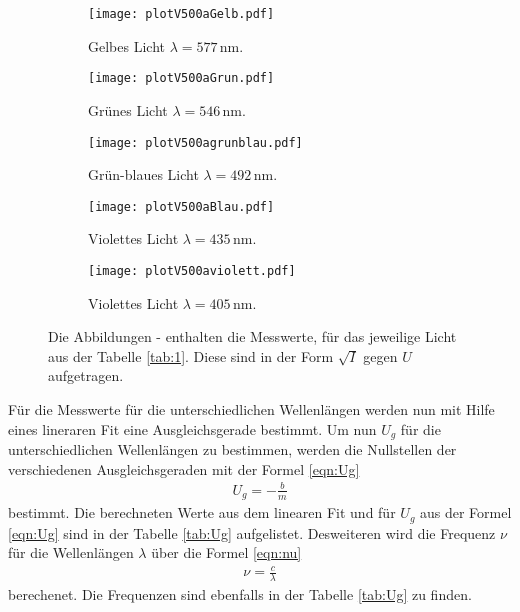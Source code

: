 \begin{figure}
\centering
\begin{subfigure}{0.48\textwidth}
\centering
\texttt{[image: plotV500aGelb.pdf]}
\caption{Gelbes Licht $\lambda=577\,\si{\nano\meter}$.}
\label{fig:ge}
\end{subfigure}
\begin{subfigure}{0.48\textwidth}
\centering
\texttt{[image: plotV500aGrun.pdf]}
\caption{Grünes Licht $\lambda=546\,\si{\nano\meter}$.}
\label{fig:gr}
\end{subfigure}

\begin{subfigure}{0.48\textwidth}
\centering
\texttt{[image: plotV500agrunblau.pdf]}
\caption{Grün-blaues Licht  $\lambda=492\,\si{\nano\meter}$.}
\label{fig:gb}
\end{subfigure}
\begin{subfigure}{0.48\textwidth}
\centering
\texttt{[image: plotV500aBlau.pdf]}
\caption{Violettes Licht $\lambda=435\,\si{\nano\meter}$.}
\label{fig:v1}
\end{subfigure}

\begin{subfigure}{0.48\textwidth}
\centering
\texttt{[image: plotV500aviolett.pdf]}
\caption{Violettes Licht $\lambda=405\,\si{\nano\meter}$.}
\label{fig:v2}
\end{subfigure}

\caption{Die Abbildungen - enthalten die
Messwerte, für das jeweilige Licht aus der Tabelle \ref{tab:1}. Diese sind in der Form
$\sqrt{I}$ gegen $U$ aufgetragen.}
\label{fig:1}
\end{figure}




Für die Messwerte für die unterschiedlichen Wellenlängen werden
nun mit Hilfe eines lineraren Fit eine Ausgleichsgerade bestimmt.
Um nun $U_g$ für die unterschiedlichen Wellenlängen zu bestimmen,
werden die Nullstellen der verschiedenen Ausgleichsgeraden mit der Formel \eqref{eqn:Ug}
\begin{align}
  U_g=-\frac{b}{m}\label{eqn:Ug}
\end{align}
bestimmt.
Die berechneten Werte aus dem linearen Fit und für $U_g$ aus der Formel
\eqref{eqn:Ug} sind in der Tabelle \ref{tab:Ug} aufgelistet.
Desweiteren wird die Frequenz $\nu$ für die Wellenlängen $\lambda$ über die Formel \eqref{eqn:nu}
\begin{align}
 \nu=\frac{c}{\lambda}\label{eqn:nu}
\end{align}
berechenet. Die Frequenzen sind ebenfalls in der Tabelle \ref{tab:Ug} zu finden.



